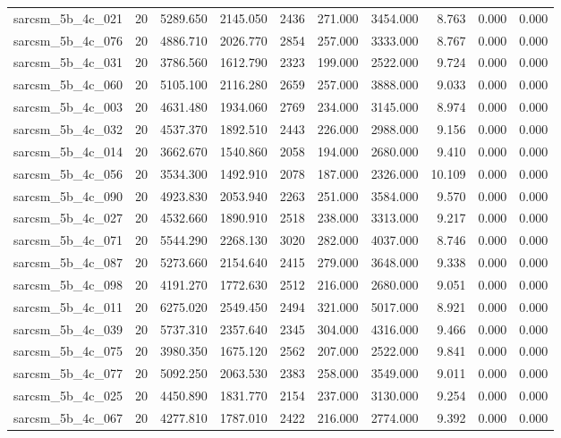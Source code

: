 \begin{tabular}{lrrrrrrrrr}
sarcsm\_5b\_4c\_021 & 20 & 5289.650 & 2145.050 & 2436 & 271.000 & 3454.000 & 8.763 & 0.000 & 0.000 \\
sarcsm\_5b\_4c\_076 & 20 & 4886.710 & 2026.770 & 2854 & 257.000 & 3333.000 & 8.767 & 0.000 & 0.000 \\
sarcsm\_5b\_4c\_031 & 20 & 3786.560 & 1612.790 & 2323 & 199.000 & 2522.000 & 9.724 & 0.000 & 0.000 \\
sarcsm\_5b\_4c\_060 & 20 & 5105.100 & 2116.280 & 2659 & 257.000 & 3888.000 & 9.033 & 0.000 & 0.000 \\
sarcsm\_5b\_4c\_003 & 20 & 4631.480 & 1934.060 & 2769 & 234.000 & 3145.000 & 8.974 & 0.000 & 0.000 \\
sarcsm\_5b\_4c\_032 & 20 & 4537.370 & 1892.510 & 2443 & 226.000 & 2988.000 & 9.156 & 0.000 & 0.000 \\
sarcsm\_5b\_4c\_014 & 20 & 3662.670 & 1540.860 & 2058 & 194.000 & 2680.000 & 9.410 & 0.000 & 0.000 \\
sarcsm\_5b\_4c\_056 & 20 & 3534.300 & 1492.910 & 2078 & 187.000 & 2326.000 & 10.109 & 0.000 & 0.000 \\
sarcsm\_5b\_4c\_090 & 20 & 4923.830 & 2053.940 & 2263 & 251.000 & 3584.000 & 9.570 & 0.000 & 0.000 \\
sarcsm\_5b\_4c\_027 & 20 & 4532.660 & 1890.910 & 2518 & 238.000 & 3313.000 & 9.217 & 0.000 & 0.000 \\
sarcsm\_5b\_4c\_071 & 20 & 5544.290 & 2268.130 & 3020 & 282.000 & 4037.000 & 8.746 & 0.000 & 0.000 \\
sarcsm\_5b\_4c\_087 & 20 & 5273.660 & 2154.640 & 2415 & 279.000 & 3648.000 & 9.338 & 0.000 & 0.000 \\
sarcsm\_5b\_4c\_098 & 20 & 4191.270 & 1772.630 & 2512 & 216.000 & 2680.000 & 9.051 & 0.000 & 0.000 \\
sarcsm\_5b\_4c\_011 & 20 & 6275.020 & 2549.450 & 2494 & 321.000 & 5017.000 & 8.921 & 0.000 & 0.000 \\
sarcsm\_5b\_4c\_039 & 20 & 5737.310 & 2357.640 & 2345 & 304.000 & 4316.000 & 9.466 & 0.000 & 0.000 \\
sarcsm\_5b\_4c\_075 & 20 & 3980.350 & 1675.120 & 2562 & 207.000 & 2522.000 & 9.841 & 0.000 & 0.000 \\
sarcsm\_5b\_4c\_077 & 20 & 5092.250 & 2063.530 & 2383 & 258.000 & 3549.000 & 9.011 & 0.000 & 0.000 \\
sarcsm\_5b\_4c\_025 & 20 & 4450.890 & 1831.770 & 2154 & 237.000 & 3130.000 & 9.254 & 0.000 & 0.000 \\
sarcsm\_5b\_4c\_067 & 20 & 4277.810 & 1787.010 & 2422 & 216.000 & 2774.000 & 9.392 & 0.000 & 0.000 \\

\end{tabular}
